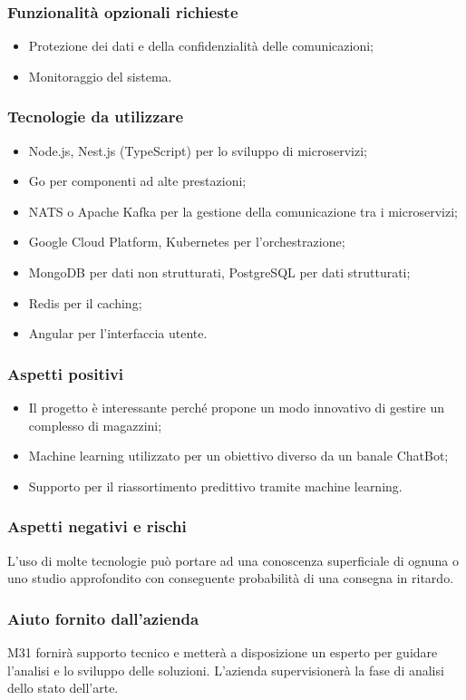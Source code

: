 \documentclass[10pt]{article}
\begin{document}
\subsubsection{Funzionalità opzionali richieste}
\begin{itemize}
    \item Protezione dei dati e della confidenzialità delle comunicazioni;
    \item Monitoraggio del sistema.
\end{itemize}
\subsubsection{Tecnologie da utilizzare}
\begin{itemize}
\item Node.js, Nest.js (TypeScript) per lo sviluppo di microservizi;
\item Go per componenti ad alte prestazioni;
\item NATS o Apache Kafka per la gestione della comunicazione tra i microservizi;
\item Google Cloud Platform, Kubernetes per l'orchestrazione;
\item MongoDB per dati non strutturati, PostgreSQL per dati strutturati;
\item Redis per il caching;
\item Angular per l'interfaccia utente.
\end{itemize}
\subsubsection{Aspetti positivi}
\begin{itemize}
    \item Il progetto è interessante perché propone un modo innovativo di gestire un complesso di magazzini;
    \item Machine learning utilizzato per un obiettivo diverso da un banale ChatBot;
    \item Supporto per il riassortimento predittivo tramite machine learning.
\end{itemize}
\subsubsection{Aspetti negativi e rischi}
L’uso di molte tecnologie può portare ad una conoscenza superficiale di ognuna o uno studio approfondito con conseguente probabilità di una consegna in ritardo.
\subsubsection{Aiuto fornito dall'azienda}
M31 fornirà supporto tecnico e metterà a disposizione un esperto per guidare l'analisi e lo sviluppo delle soluzioni. L'azienda supervisionerà la fase di analisi dello stato dell'arte.
\end{document}
